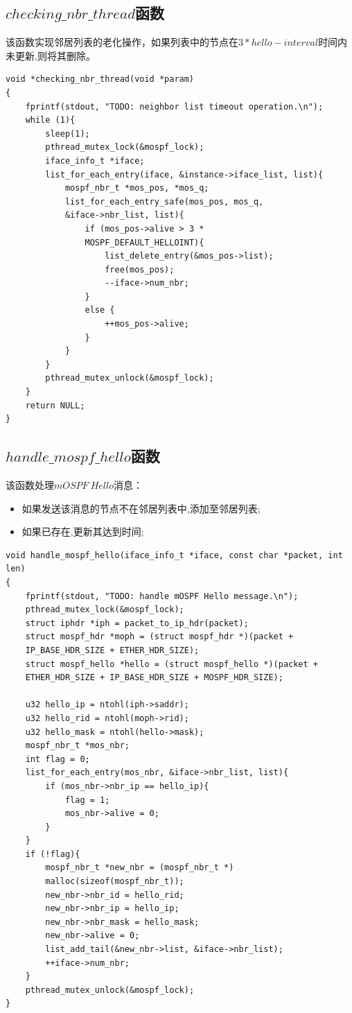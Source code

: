 \documentclass[UTF8,noindent]{ctexart}
\begin{document}
\subsection{$checking\_nbr\_thread$函数}
该函数实现邻居列表的老化操作，如果列表中的节点在$3*hello-interval$时间内未更新,则将其删除。
\begin{lstlisting}
void *checking_nbr_thread(void *param)
{
	fprintf(stdout, "TODO: neighbor list timeout operation.\n");
	while (1){
		sleep(1);
		pthread_mutex_lock(&mospf_lock);
		iface_info_t *iface;
		list_for_each_entry(iface, &instance->iface_list, list){
			mospf_nbr_t *mos_pos, *mos_q;
			list_for_each_entry_safe(mos_pos, mos_q, 
			&iface->nbr_list, list){
				if (mos_pos->alive > 3 *
				MOSPF_DEFAULT_HELLOINT){
					list_delete_entry(&mos_pos->list);
					free(mos_pos);
					--iface->num_nbr;
				}
				else {
					++mos_pos->alive;
				}
			}
		}
		pthread_mutex_unlock(&mospf_lock);
	}
	return NULL;
}
\end{lstlisting}

\subsection{$handle\_mospf\_hello$函数}
该函数处理$mOSPF\ Hello$消息：
\begin{itemize}
  \item 如果发送该消息的节点不在邻居列表中,添加至邻居列表;
  \item 如果已存在,更新其达到时间;
\end{itemize}
\begin{lstlisting}
void handle_mospf_hello(iface_info_t *iface, const char *packet, int len)
{
	fprintf(stdout, "TODO: handle mOSPF Hello message.\n");
	pthread_mutex_lock(&mospf_lock);
	struct iphdr *iph = packet_to_ip_hdr(packet);
	struct mospf_hdr *moph = (struct mospf_hdr *)(packet + 
	IP_BASE_HDR_SIZE + ETHER_HDR_SIZE);
	struct mospf_hello *hello = (struct mospf_hello *)(packet + 
	ETHER_HDR_SIZE + IP_BASE_HDR_SIZE + MOSPF_HDR_SIZE);

	u32 hello_ip = ntohl(iph->saddr);
	u32 hello_rid = ntohl(moph->rid);
	u32 hello_mask = ntohl(hello->mask);
	mospf_nbr_t *mos_nbr;
	int flag = 0;
	list_for_each_entry(mos_nbr, &iface->nbr_list, list){
		if (mos_nbr->nbr_ip == hello_ip){
			flag = 1;
			mos_nbr->alive = 0;
		}
	}
	if (!flag){
		mospf_nbr_t *new_nbr = (mospf_nbr_t *)
		malloc(sizeof(mospf_nbr_t));
		new_nbr->nbr_id = hello_rid;
		new_nbr->nbr_ip = hello_ip;
		new_nbr->nbr_mask = hello_mask;
		new_nbr->alive = 0;
		list_add_tail(&new_nbr->list, &iface->nbr_list);
		++iface->num_nbr;
	}
	pthread_mutex_unlock(&mospf_lock);
}
\end{lstlisting}
\end{document}
